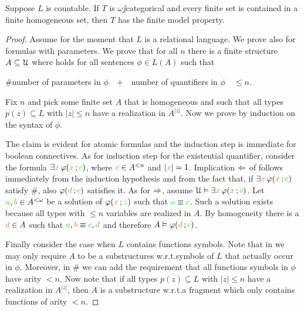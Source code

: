 \documentclass[creche.tex]{subfiles}
\begin{document}
\begin{lemma}\label{lem_zilbergiocattolo} Suppose $L$ is countable. If $T$ is $\omega\jj$categorical and every finite set is contained in a finite homogeneous set, then $T$ has the finite model property.
\end{lemma}
\begin{proof}
Assume for the moment that $L$ is a relational language. We prove  also for formulas with parameters. We prove that for all $n$ there is a finite structure $A\subseteq\EuScript U$ where  holds for all sentences $\phi\in L(A)$ such that

$\#$\hfil number of parameters in $\phi$\ \  $+$\ \  number of quantifiers in $\phi$\ \ $\le n$.

Fix $n$ and pick some finite set $A$ that is homogeneous and such that all types $p(z)\subseteq L$ with $|z|\le n$ have a realization in $A^{|z|}$. Now we prove  by induction on the syntax of $\phi$.

The claim is evident for atomic formulas and the induction step is immediate for boolean connectives. As for induction step for the existential quantifier, consider the formula $\exists {\color{brown}x}\,\varphi({\color{brown} x}\,;{\color{green} c})$, where ${\color{green} c}\in A^{<n}$ and $|{\color{brown} x}|=1$. Implication $\Leftarrow$ of  follows immediately from the induction hypothesis and from the fact that, if $\exists {\color{brown}x}\,\varphi({\color{brown} x}\,;{\color{green} c})$ satisfy $\#$, also $\varphi({\color{brown} d}\,;{\color{green} c})$ satisfies it. As for $\Rightarrow$, assume $\EuScript U\vDash\exists {\color{brown}x}\, \varphi({\color{brown} x}\,;{\color{green} c})$. Let ${\color{green} a},{\color{brown} b}\in A^{<\omega}$ be a solution of $\varphi({\color{brown} x}\,;{\color{green} z})$ such that ${\color{green} a}\equiv{\color{green}c}$. Such a solution exists because all types with $\le n$ variables are realized in $A$. By homogeneity there is a ${\color{brown} d}\in A$ such that ${\color{green} a},{\color{brown} b}\equiv {\color{green}c},{\color{brown} d}$ and therefore $A\vDash\varphi({\color{brown} d}\,;{\color{green} c})$.

Finally consider the case when $L$ contains functions symbols. Note that in  we may only require $A$ to be a substructures w.r.t.\@ symbols of $L$ that actually occur in $\phi$. Moreover, in $\#$ we can add the requirement that all functions symbols in $\phi$ have arity $< n$. Now note that if all types $p(z)\subseteq L$ with $|z|\le n$ have a realization in $A^{|z|}$, then $A$ is a substructure w.r.t.\@ a fragment which only contains functions of arity $< n$.
\end{proof}
\end{document}
